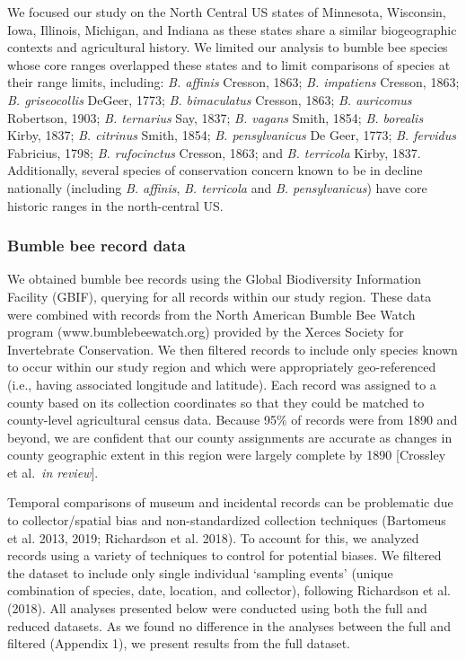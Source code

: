 \documentclass[11pt,]{article}
\begin{document}
We focused our study on the North Central US states of Minnesota,
Wisconsin, Iowa, Illinois, Michigan, and Indiana as these states share a
similar biogeographic contexts and agricultural history. We limited our
analysis to bumble bee species whose core ranges overlapped these states
and to limit comparisons of species at their range limits, including:
\emph{B. affinis} Cresson, 1863; \emph{B. impatiens} Cresson, 1863;
\emph{B. griseocollis} DeGeer, 1773; \emph{B. bimaculatus} Cresson,
1863; \emph{B. auricomus} Robertson, 1903; \emph{B. ternarius} Say,
1837; \emph{B. vagans} Smith, 1854; \emph{B. borealis} Kirby, 1837;
\emph{B. citrinus} Smith, 1854; \emph{B. pensylvanicus} De Geer, 1773;
\emph{B. fervidus} Fabricius, 1798; \emph{B. rufocinctus} Cresson, 1863;
and \emph{B. terricola} Kirby, 1837. Additionally, several species of
conservation concern known to be in decline nationally (including
\emph{B. affinis}, \emph{B. terricola} and \emph{B. pensylvanicus}) have
core historic ranges in the north-central US.

\hypertarget{bumble-bee-record-data}{%
\subsubsection{Bumble bee record data}\label{bumble-bee-record-data}}

We obtained bumble bee records using the Global Biodiversity Information
Facility (GBIF), querying for all records within our study region. These
data were combined with records from the North American Bumble Bee Watch
program (www.bumblebeewatch.org) provided by the Xerces Society for
Invertebrate Conservation. We then filtered records to include only
species known to occur within our study region and which were
appropriately geo-referenced (i.e., having associated longitude and
latitude). Each record was assigned to a county based on its collection
coordinates so that they could be matched to county-level agricultural
census data. Because 95\% of records were from 1890 and beyond, we are
confident that our county assignments are accurate as changes in county
geographic extent in this region were largely complete by 1890
{[}Crossley et al.~\emph{in review}{]}.

Temporal comparisons of museum and incidental records can be problematic
due to collector/spatial bias and non-standardized collection techniques
(Bartomeus et al. 2013, 2019; Richardson et al. 2018). To account for
this, we analyzed records using a variety of techniques to control for
potential biases. We filtered the dataset to include only single
individual `sampling events' (unique combination of species, date,
location, and collector), following Richardson et al. (2018). All
analyses presented below were conducted using both the full and reduced
datasets. As we found no difference in the analyses between the full and
filtered (Appendix 1), we present results from the full dataset.
\end{document}
